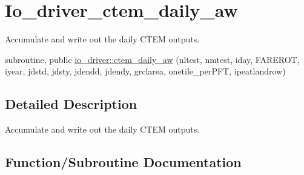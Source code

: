 \hypertarget{group__io__driver__ctem__daily__aw}{}\section{Io\+\_\+driver\+\_\+ctem\+\_\+daily\+\_\+aw}
\label{group__io__driver__ctem__daily__aw}


Accumulate and write out the daily C\+T\+E\+M outputs.  


\begin{DoxyCompactItemize}
\item 
subroutine, public \hyperlink{group__io__driver__ctem__daily__aw_gaabb54fc6376839cc19d2b3591a963802}{io\+\_\+driver\+::ctem\+\_\+daily\+\_\+aw} (nltest, nmtest, iday, F\+A\+R\+E\+R\+O\+T, iyear, jdstd, jdsty, jdendd, jdendy, grclarea, onetile\+\_\+per\+P\+F\+T, ipeatlandrow)
\end{DoxyCompactItemize}


\subsection{Detailed Description}
Accumulate and write out the daily C\+T\+E\+M outputs. 



\subsection{Function/\+Subroutine Documentation}
\hypertarget{group__io__driver__ctem__daily__aw_gaabb54fc6376839cc19d2b3591a963802}{}
